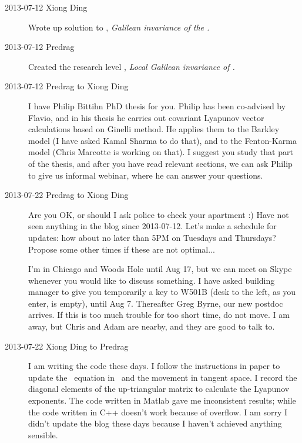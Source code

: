 \begin{description}
\item[2013-07-12 Xiong Ding] Wrote up solution to ,
{\em Galilean invariance of the \KSe.}

\item[2013-07-12 Predrag] Created the research level ,
{\em Local Galilean invariance of \KS.}

\item[2013-07-12 Predrag to Xiong Ding]
I have  {Philip
Bittihn} PhD thesis for you. Philip has been
co-advised by Flavio, and in his thesis he carries out covariant
Lyapunov vector calculations based on Ginelli
\etal{} method. He applies them to the Barkley
model (I have asked Kamal Sharma to do that), and to the Fenton-Karma
model (Chris Marcotte is working on that). I suggest you study that
part of the thesis, and after you have read relevant sections, we can
ask Philip to give us informal webinar, where he can answer your
questions.

\item[2013-07-22 Predrag to Xiong Ding] Are you OK, or should I ask police to check
your apartment :) Have not seen anything in the blog since 2013-07-12. Let's
make a schedule for updates: how about no later than 5PM on Tuesdays and Thursdays?
Propose some other times if these are not optimal...

I'm in Chicago and
 {Woods Hole}
until Aug 17, but we can meet on Skype whenever you would like to discuss
something. I have asked building manager to give you temporarily a key to
W501B (desk to the left, as you enter, is empty), until Aug 7.
Thereafter Greg Byrne, our new
postdoc arrives. If this is too much trouble for too short time, do not move.
I am away, but Chris and Adam are nearby, and they are good to talk to.

\item[2013-07-22 Xiong Ding to Predrag] I am writing the code these
    days. I follow the instructions in paper  to update
    the \KS\ equation in \statesp\ and the movement in tangent space. I
    record the diagonal elements of the up-triangular matrix to
    calculate the Lyapunov exponents. The code written in Matlab gave
    me inconsistent results; while the code written in C++ doesn't work
    because of overflow. I am sorry I didn't update the blog these days
    because I haven't achieved anything sensible.


\end{description}
